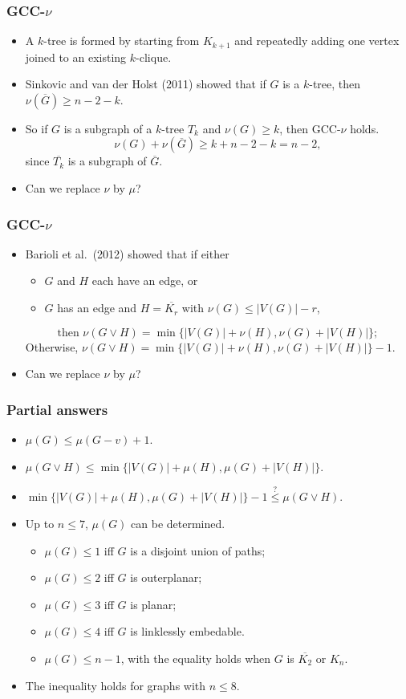 \documentclass{beamer}
\def \Gbar{\overline{G}}
\begin{document}

\begin{frame}
\frametitle{GCC-$\nu$}
\begin{itemize}
\item A \alert{$k$-tree} is formed by starting from $K_{k+1}$ and repeatedly adding one vertex joined to an existing $k$-clique.
\item Sinkovic and van der Holst (2011) showed that if $G$ is a $k$-tree, then $\nu(\Gbar)\geq n-2-k$.
\item So if $G$ is a subgraph of a $k$-tree $T_k$ and $\nu(G)\geq k$, then GCC-$\nu$ holds.
\[\nu(G)+\nu(\Gbar)\geq k+n-2-k=n-2,\]
since $\overline{T_k}$ is a subgraph of $\Gbar$.
\item Can we replace $\nu$ by $\mu$?
\nocite{SvdH}
\end{itemize}
\end{frame}


\begin{frame}
\frametitle{GCC-$\nu$}
\begin{itemize}
\item Barioli et al.~(2012) showed that if either
\begin{itemize}
\item $G$ and $H$ each have an edge, or
\item $G$ has an edge and $H=\overline{K_r}$ with $\nu(G)\leq |V(G)|-r$,
\end{itemize}
\[\text{then~}\nu(G\vee H)=\min\{|V(G)|+\nu(H),\nu(G)+|V(H)|\};\]
Otherwise, $\nu(G\vee H)=\min\{|V(G)|+\nu(H),\nu(G)+|V(H)|\}-1$.

\item Can we replace $\nu$ by $\mu$?
\nocite{GCC}
\end{itemize}
\end{frame}


\begin{frame}
\frametitle{Partial answers}
\begin{itemize}
\item $\mu(G)\leq \mu(G-v)+1$.
\item $\mu(G\vee H)\leq \min\{|V(G)|+\mu(H),\mu(G)+|V(H)|\}$.
\item $\min\{|V(G)|+\mu(H),\mu(G)+|V(H)|\}-1\overset{?}{\leq} \mu(G\vee H)$.
\item Up to $n\leq 7$, $\mu(G)$ can be determined.
\begin{itemize}
\item $\mu(G)\leq 1$ iff $G$ is a disjoint union of paths;
\item $\mu(G)\leq 2$ iff $G$ is outerplanar;
\item $\mu(G)\leq 3$ iff $G$ is planar;
\item $\mu(G)\leq 4$ iff $G$ is linklessly embedable.
\item $\mu(G)\leq n-1$, with the equality holds when $G$ is $\overline{K_2}$ or $K_n$.
\end{itemize}
\item The inequality holds for graphs with $n\leq 8$.

\end{itemize}
\end{frame}
\end{document}
